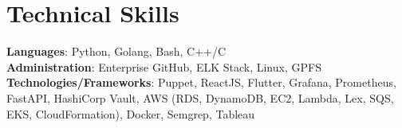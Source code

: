 \documentclass[letterpaper,11pt]{article}
\newcommand{\resumeSubHeadingListStart}{\begin{itemize}[leftmargin=0.0in, label={}]}
\newcommand{\resumeSubHeadingListEnd}{\end{itemize}}
\begin{document}
\section{Technical Skills}
 \begin{itemize}[leftmargin=0.15in, label={}]
    \small{\item{
     \textbf{Languages}{: Python, Golang, Bash, C++/C} \\
     \textbf{Administration}{: Enterprise GitHub, ELK Stack, Linux, GPFS} \\
     \textbf{Technologies/Frameworks}{: Puppet, ReactJS, Flutter, Grafana, Prometheus, FastAPI, HashiCorp Vault, AWS (RDS, DynamoDB, EC2, Lambda, Lex, SQS, EKS, CloudFormation), Docker, Semgrep, Tableau} \\
    }}
 \end{itemize}
 \vspace{-20pt}


\end{document}
